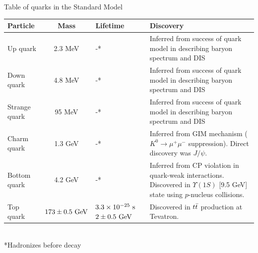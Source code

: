 \begin{table}
\begin{center}
Table of quarks in the Standard Model \\
\def\arraystretch{1.5}
\begin{tabular}{|l||c|p{}|p{}|}
\hline
Particle & Mass & Lifetime & Discovery\\
\hline
\hline
Up quark & 2.3 MeV & -* & Inferred from success of quark model in describing baryon spectrum and DIS\\ \hline
Down quark & 4.8 MeV & -* & Inferred from success of quark model in describing baryon spectrum and DIS\\ \hline
Strange quark & 95 MeV & -* & Inferred from success of quark model in describing baryon spectrum and DIS\\ \hline
Charm quark & 1.3 GeV & -* & Inferred from GIM mechanism ($K^0\rightarrow \mu^+\mu^-$ suppression). Direct discovery was $J/\psi$.\\ \hline
Bottom quark & 4.2 GeV & -* & Inferred from CP violation in quark-weak interactions. Discovered in $\Upsilon(1S)$ [9.5 GeV] state using $p$-nucleus collisions.\\ \hline
Top quark & $173 \pm 0.5~\text{GeV}$ & $3.3\times 10^{-25}~\text{s}$\newline $2 \pm 0.5~\text{GeV}$ & Discovered in $t\bar{t}$ production at Tevatron. \\ \hline
\end{tabular}\\
*Hadronizes before decay

\end{center}
\end{table}


